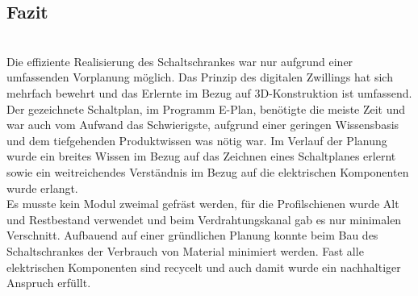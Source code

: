 \subsection{Fazit}\mbox{}\\
    Die effiziente Realisierung des Schaltschrankes war nur aufgrund einer umfassenden Vorplanung möglich. Das Prinzip des digitalen Zwillings hat sich mehrfach bewehrt und das Erlernte im Bezug auf 3D-Konstruktion ist umfassend.\\
    Der gezeichnete Schaltplan, im Programm E-Plan, benötigte die meiste Zeit und war auch vom Aufwand das Schwierigste, aufgrund einer geringen Wissensbasis und dem tiefgehenden Produktwissen was nötig war. Im Verlauf der Planung wurde ein breites Wissen im Bezug auf das Zeichnen eines Schaltplanes erlernt sowie ein weitreichendes Verständnis im Bezug auf die elektrischen Komponenten wurde erlangt.\\
    Es musste kein Modul zweimal gefräst werden, für die Profilschienen wurde Alt und Restbestand verwendet und beim Verdrahtungskanal gab es nur minimalen Verschnitt. Aufbauend auf einer gründlichen Planung konnte beim Bau des Schaltschrankes der Verbrauch von Material minimiert werden. Fast alle elektrischen Komponenten sind recycelt und auch damit wurde ein nachhaltiger Anspruch erfüllt.\\


